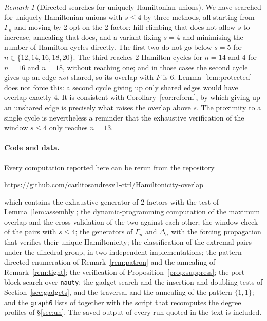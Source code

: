 \documentclass[11pt,a4paper]{article}
\theoremstyle{definition}
\theoremstyle{remark}
\newtheorem{remark}[theorem]{Remark}
\begin{document}
\begin{remark}[Directed searches for uniquely Hamiltonian unions]\label{rem:searchUH}
We have searched for uniquely Hamiltonian unions with $s\le4$ by three methods, all starting from $\Gamma_n$ and moving by 2-opt on the 2-factor: hill climbing that does not allow $s$ to increase, annealing that does, and a variant fixing $s=4$ and minimising the number of Hamilton cycles directly. The first two do not go below $s=5$ for $n\in\{12,14,16,18,20\}$. The third reaches $2$ Hamilton cycles for $n=14$ and $4$ for $n=16$ and $n=18$, without reaching one; and in those cases the second cycle gives up an edge \emph{not} shared, so its overlap with $F$ is $6$. Lemma~\ref{lem:protected} does not force this: a second cycle giving up only shared edges would have overlap exactly $4$. It is consistent with Corollary~\ref{cor:reform}, by which giving up an unshared edge is precisely what raises the overlap above $s$. The proximity to a single cycle is nevertheless a reminder that the exhaustive verification of the window $s\le4$ only reaches $n=13$.
\end{remark}

\paragraph{Code and data.} Every computation reported here can be rerun from the repository
\begin{center}
\url{https://github.com/carlitosandresv1-ctrl/Hamiltonicity-overlap}
\end{center}
which contains the exhaustive generator of 2-factors with the test of Lemma~\ref{lem:assembly}; the dynamic-programming computation of the maximum overlap and the cross-validation of the two against each other; the window check of the pairs with $s\le4$; the generators of $\Gamma_n$ and $\Delta_n$ with the forcing propagation that verifies their unique Hamiltonicity; the classification of the extremal pairs under the dihedral group, in two independent implementations; the pattern-directed enumeration of Remark~\ref{rem:patron} and the annealing of Remark~\ref{rem:tight}; the verification of Proposition~\ref{prop:suppress}; the port-block search over \texttt{nauty}; the gadget search and the insertion and doubling tests of Section~\ref{sec:gadgets}, and the traversal and the annealing of the pattern $\{1,1\}$; and the \texttt{graph6} lists of \cite{hog} together with the script that recomputes the degree profiles of \S\ref{sec:uh}. The saved output of every run quoted in the text is included.
\end{document}
